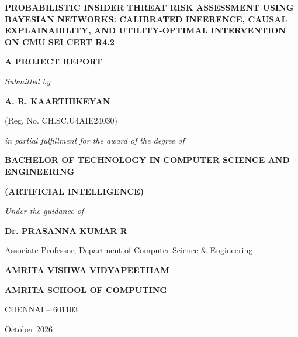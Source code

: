 \documentclass[12pt,a4paper]{report}
\begin{document}
\begin{titlepage}
\begin{center}
\vspace*{0.5cm}

{\fontsize{15}{18}\bfseries PROBABILISTIC INSIDER THREAT RISK ASSESSMENT USING BAYESIAN NETWORKS: CALIBRATED INFERENCE, CAUSAL EXPLAINABILITY, AND UTILITY-OPTIMAL INTERVENTION ON CMU SEI CERT R4.2\par}

\vspace{1.5cm}
{\fontsize{13}{16}\bfseries A PROJECT REPORT\par}
\vspace{0.4cm}
{\fontsize{11}{14}\itshape Submitted by\par}
\vspace{0.6cm}

{\fontsize{12}{15}\bfseries A. R. KAARTHIKEYAN\par}
{\fontsize{11}{14}(Reg. No. CH.SC.U4AIE24030)\par}

\vspace{1.2cm}
{\fontsize{11}{14}\itshape in partial fulfillment for the award of the degree of\par}
\vspace{0.3cm}
{\fontsize{12}{15}\bfseries BACHELOR OF TECHNOLOGY IN COMPUTER SCIENCE AND ENGINEERING\par}
{\fontsize{11}{14}\bfseries (ARTIFICIAL INTELLIGENCE)\par}

\vspace{1.2cm}
{\fontsize{11}{14}\itshape Under the guidance of\par}
\vspace{0.3cm}
{\fontsize{12}{15}\bfseries Dr. PRASANNA KUMAR R\par}
{\fontsize{11}{14}Associate Professor, Department of Computer Science \& Engineering\par}

\vspace{1.5cm}
{\fontsize{14}{17}\bfseries AMRITA VISHWA VIDYAPEETHAM\par}
{\fontsize{12}{15}\bfseries AMRITA SCHOOL OF COMPUTING\par}
{\fontsize{11}{14}CHENNAI -- 601103\par}
\vspace{0.3cm}
{\fontsize{11}{14}October 2026\par}

\end{center}
\end{titlepage}
\end{document}
